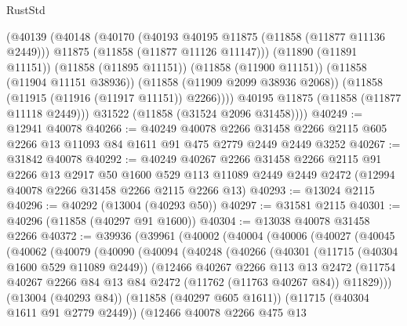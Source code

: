 \begin{lexlean}{RustStd}
\begin{coremodule}
          (@40139
            (@40148
              (@40170
                (@40193 @40195 @11875 (@11858 (@11877 @11136 @2449)))
                @11875
                (@11858 (@11877 @11126 @11147)))
              (@11890 (@11891 @11151))
              (@11858 (@11895 @11151))
              (@11858 (@11900 @11151))
              (@11858 (@11904 @11151 @38936))
              (@11858 (@11909 @2099 @38936 @2068))
              (@11858 (@11915 (@11916 (@11917 @11151)) @2266))))
          @40195
          @11875
          (@11858 (@11877 @11118 @2449)))
        @31522
        (@11858 (@31524 @2096 @31458))))
@40249 := @12941 @40078
@40266 := @40249
    @40078
    @2266
    @31458
    @2266
    @2115
    @605
    @2266
    @13
    @11093
    @84
    @1611
    @91
    @475
    @2779
    @2449
    @2449
    @3252
@40267 := @31842 @40078
@40292 := @40249
    @40267
    @2266
    @31458
    @2266
    @2115
    @91
    @2266
    @13
    @2917
    @50
    @1600
    @529
    @113
    @11089
    @2449
    @2449
    @2472
    (@12994 @40078 @2266 @31458 @2266 @2115 @2266 @13)
@40293 := @13024 @2115
@40296 := @40292 (@13004 (@40293 @50))
@40297 := @31581 @2115
@40301 := @40296 (@11858 (@40297 @91 @1600))
@40304 := @13038 @40078 @31458 @2266
@40372 := @39936
    (@39961
      (@40002
        (@40004
          (@40006
            (@40027
              (@40045
                (@40062
                  (@40079
                    (@40090
                      (@40094
                        (@40248
                          (@40266
                            (@40301
                              (@11715 (@40304 @1600 @529 @11089 @2449))
                              (@12466
                                @40267
                                @2266
                                @113
                                @13
                                @2472
                                (@11754
                                  @40267
                                  @2266
                                  @84
                                  @13
                                  @84
                                  @2472
                                  (@11762 (@11763 @40267 @84))
                                  @11829)))
                            (@13004 (@40293 @84))
                            (@11858 (@40297 @605 @1611))
                            (@11715 (@40304 @1611 @91 @2779 @2449))
                            (@12466
                              @40078
                              @2266
                              @475
                              @13

\end{coremodule}
\end{lexlean}
